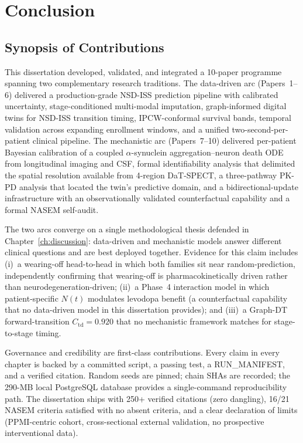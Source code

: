 
\chapter{Conclusion}
\label{ch:conclusion}

\section{Synopsis of Contributions}
\label{sec:conc-synopsis}

This dissertation developed, validated, and integrated a 10-paper programme spanning two complementary research traditions. The data-driven arc (Papers~1--6) delivered a production-grade NSD-ISS prediction pipeline with calibrated uncertainty, stage-conditioned multi-modal imputation, graph-informed digital twins for NSD-ISS transition timing, IPCW-conformal survival bands, temporal validation across expanding enrollment windows, and a unified two-second-per-patient clinical pipeline. The mechanistic arc (Papers~7--10) delivered per-patient Bayesian calibration of a coupled $\alpha$-synuclein aggregation--neuron death ODE from longitudinal imaging and CSF, formal identifiability analysis that delimited the spatial resolution available from 4-region DaT-SPECT, a three-pathway PK-PD analysis that located the twin's predictive domain, and a bidirectional-update infrastructure with an observationally validated counterfactual capability and a formal NASEM self-audit.

The two arcs converge on a single methodological thesis defended in Chapter~\ref{ch:discussion}: data-driven and mechanistic models answer different clinical questions and are best deployed together. Evidence for this claim includes (i)~a wearing-off head-to-head in which both families sit near random-prediction, independently confirming that wearing-off is pharmacokinetically driven rather than neurodegeneration-driven; (ii)~a Phase~4 interaction model in which patient-specific $N(t)$ modulates levodopa benefit (a counterfactual capability that no data-driven model in this dissertation provides); and (iii)~a Graph-DT forward-transition $C_\text{td} = 0.920$ that no mechanistic framework matches for stage-to-stage timing.

Governance and credibility are first-class contributions. Every claim in every chapter is backed by a committed script, a passing test, a RUN\_MANIFEST, and a verified citation. Random seeds are pinned; chain SHAs are recorded; the 290-MB local PostgreSQL database provides a single-command reproducibility path. The dissertation ships with 250+ verified citations (zero dangling), 16/21 NASEM criteria satisfied with no absent criteria, and a clear declaration of limits (PPMI-centric cohort, cross-sectional external validation, no prospective interventional data).

